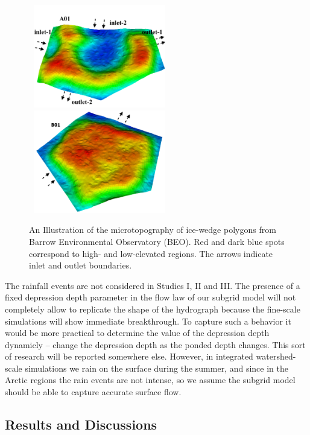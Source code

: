 \documentclass[review,11pt]{elsarticle}
\begin{document}
\begin{figure}[!h]
\includegraphics[width=6.2cm, height=4.5cm]{./figures/polygons-finescale/3DpolygonA01-3D.png}\\
\includegraphics[width=6.2cm, height=4.5cm]{./figures/polygons-finescale/3DpolygonB01-3B.png}
\caption{An Illustration of the microtopography of ice-wedge polygons from Barrow Environmental Observatory (BEO). Red and dark blue spots correspond to high- and low-elevated regions. The arrows indicate inlet and outlet boundaries.}
\label{IWP-finescale}
\end{figure}

The rainfall events are not considered in Studies I, II and III. The presence of a fixed depression depth parameter in the flow law of our subgrid model will not completely allow to replicate the shape of the hydrograph because the fine-scale simulations will show immediate breakthrough. To capture such a behavior it would be more practical to determine the value of the depression depth dynamicly -- change the depression depth as the ponded depth changes. This sort of research will be reported somewhere else. However, in integrated watershed-scale simulations we rain on the surface during the summer, and since in the Arctic regions the rain events are not intense, so we assume the subgrid model should be able to capture accurate surface flow. 


\FloatBarrier
\subsection{Results and Discussions}
\end{document}
